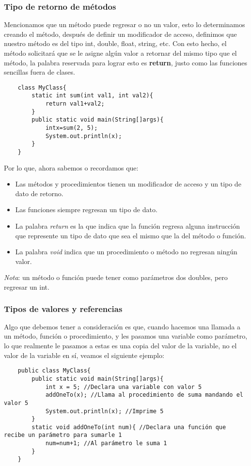 \subsubsection{Tipo de retorno de métodos}
\hspace{0.55cm}Mencionamos que un método puede regresar o no un valor, esto lo determinamos creando el método, después de definir un modificador de acceso, definimos que nuestro método es del tipo int, double, float, string, etc. Con esto hecho, el método solicitará que se le asigne algún valor a retornar del mismo tipo que el método, la palabra reservada para lograr esto es \textbf{return}, justo como las funciones sencillas fuera de clases.
\begin{lstlisting}
    class MyClass{
        static int sum(int val1, int val2){
            return val1+val2;
        }
        public static void main(String[]args){
            intx=sum(2, 5);
            System.out.println(x);
        }
    }
\end{lstlisting}

Por lo que, ahora sabemos o recordamos que:
\begin{itemize}
    \item Las métodos y procedimientos tienen un modificador de acceso y un tipo de dato de retorno.
    \item Las funciones siempre regresan un tipo de dato.
    \item La palabra \textit{return} es la que indica que la función regresa alguna instrucción que represente un tipo de dato que sea el mismo que la del método o función.
    \item La palabra \textit{void} indica que un procedimiento o método no regresan ningún valor.
\end{itemize}

\textit{Nota}: un método o función puede tener como parámetros dos doubles, pero regresar un int.


\subsubsection{Tipos de valores y referencias}
\hspace{0.55cm}Algo que debemos tener a consideración es que, cuando hacemos una llamada a un método, función o procedimiento, y les pasamos una variable como parámetro, lo que realmente le pasamos a estas es una copia del valor de la variable, no el valor de la variable en sí, veamos el siguiente ejemplo:
\begin{lstlisting}
    public class MyClass{
        public static void main(String[]args){
            int x = 5; //Declara una variable con valor 5
            addOneTo(x); //Llama al procedimiento de suma mandando el valor 5
            System.out.println(x); //Imprime 5
        }
        static void addOneTo(int num){ //Declara una función que recibe un parámetro para sumarle 1
            num=num+1; //Al parámetro le suma 1
        }
    }
\end{lstlisting}

